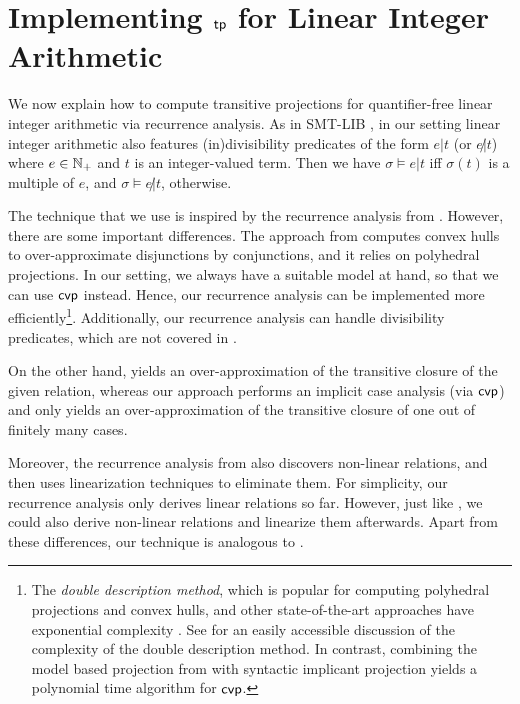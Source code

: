 \section{Implementing $\mathsf{tp}$ for Linear Integer Arithmetic}
\label{sec:rec}

We now explain how to compute transitive projections for quantifier-free linear integer arithmetic via recurrence analysis.
%
As in SMT-LIB \cite{smtlib}, in our setting linear integer arithmetic also features (in)divisibility predicates of the form $e|t$ (or $e\!{\not|}t$) where $e \in \mathbb{N}_+$ and $t$ is an integer-valued term.
%
Then we have $\sigma \models e|t$ iff $\sigma(t)$ is a multiple of $e$, and $\sigma \models e\!{\not|}t$, otherwise.

The technique that we use is inspired by the recurrence analysis from \cite{kincaid15}.
%
However, there are some important differences.
%
The approach from \cite{kincaid15} computes convex hulls to over-approximate disjunctions by conjunctions, and it relies on polyhedral projections.
%
In our setting, we always have a suitable model at hand, so that we can use $\mathsf{cvp}$ instead.
%
Hence, our recurrence analysis can be implemented more efficiently\footnote{The \emph{double description method}, which is popular for computing polyhedral projections and convex hulls, and other state-of-the-art approaches have exponential complexity \cite{dd-exp,fmplex}.
  See \cite{convex-hull} for an easily accessible discussion of the complexity of the double description method.
  In contrast, combining the model based projection from \cite{spacer} with syntactic implicant projection \cite{adcl} yields a polynomial time algorithm for $\mathsf{cvp}$.}.
%
Additionally, our recurrence analysis can handle divisibility predicates, which are not covered in \cite{kincaid15}.

On the other hand, \cite{kincaid15} yields an over-approximation of the transitive closure of the given relation, whereas our approach performs an implicit case analysis (via $\mathsf{cvp}$) and only yields an over-approximation of the transitive closure of one out of finitely many cases.

Moreover, the recurrence analysis from \cite{kincaid15} also discovers non-linear relations, and then uses linearization techniques to eliminate them.
%
For simplicity, our recurrence analysis only derives linear relations so far.
%
However, just like \cite{kincaid15}, we could also derive non-linear relations and linearize them afterwards.
%
Apart from these differences, our technique is analogous to \cite{kincaid15}.

